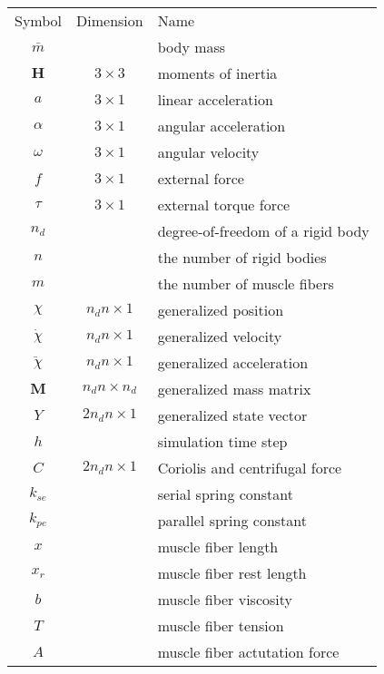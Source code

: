 \documentclass[a4paper,10pt]{article}
\begin{document}
\begin{tabular}{ c c l }
Symbol       & Dimension           & Name \\
$\bar{m}$    &                     & body mass \\
$\mathbf{H}$ & $3 \times 3$        & moments of inertia \\
$a$          & $3 \times 1$        & linear acceleration \\ 
$\alpha$     & $3 \times 1$        & angular acceleration \\
$\omega$     & $3 \times 1$        & angular velocity \\
$f$          & $3 \times 1$        & external force\\
$\tau$       & $3 \times 1$        & external torque force\\
$n_d$        &                     & degree-of-freedom of a rigid body\\
$n$          &                     & the number of rigid bodies\\
$m$          &                     & the number of muscle fibers\\
$\chi$       & $n_d n  \times 1$   & generalized position\\
$\dot\chi$   & $n_d n  \times 1$   & generalized velocity\\
$\ddot\chi$  & $n_d n  \times 1$   & generalized acceleration\\
$\mathbf{M}$ & $n_d n  \times n_d$ & generalized mass matrix\\
$Y$          & $2n_d n \times 1$   & generalized state vector\\
$h$          &                     & simulation time step\\
$C$          & $2n_d n \times 1$   & Coriolis and centrifugal force\\
$k_{se}$     &                     & serial spring constant\\
$k_{pe}$     &                     & parallel spring constant\\
$x$          &                     & muscle fiber length\\
$x_r$        &                     & muscle fiber rest length\\
$b$          &                     & muscle fiber viscosity\\
$T$          &                     & muscle fiber tension\\
$A$          &                     & muscle fiber actutation force
\end{tabular}
\end{document}
